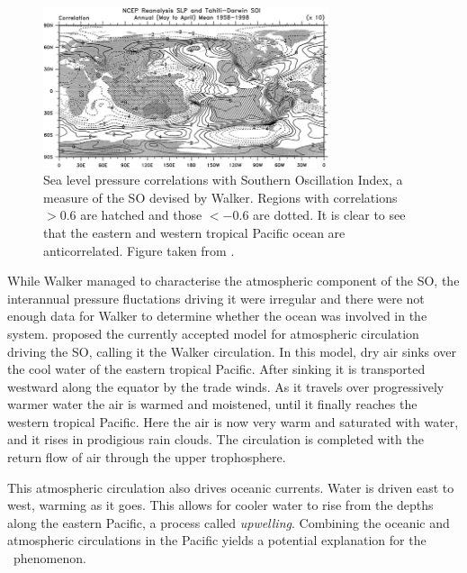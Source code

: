 \begin{figure}
  \centering
  \includegraphics[width=0.75\textwidth]{figures/slp_corr}
  \caption{Sea level pressure correlations with Southern Oscillation Index, a
    measure of the SO devised by Walker. Regions with correlations $>0.6$ are
    hatched and those $<-0.6$ are dotted. It is clear to see that the eastern
    and western tropical Pacific ocean are anticorrelated. Figure taken from
    \cite{trenberth2000}.}
  \label{fig:slp_corr}
\end{figure}

 While Walker managed to characterise the atmospheric component of the SO, the
 interannual pressure fluctations driving it were irregular and there were not
 enough data for Walker to determine whether the ocean was involved in the
 system. \cite{bjerknes1969} proposed the currently accepted model for
 atmospheric circulation driving the SO, calling it the Walker circulation. In
 this model, dry air sinks over the cool water of the eastern tropical
 Pacific. After sinking it is transported westward along the equator by the
 trade winds. As it travels over progressively warmer water the air is warmed
 and moistened, until it finally reaches the western tropical Pacific. Here the
 air is now very warm and saturated with water, and it rises in prodigious rain
 clouds. The circulation is completed with the return flow of air through the
 upper trophosphere.

This atmospheric circulation also drives oceanic currents. Water is driven east
to west, warming as it goes. This allows for cooler water to rise from the
depths along the eastern Pacific, a process called \emph{upwelling}. Combining
the oceanic and atmospheric circulations in the Pacific yields a potential
explanation for the \elnino\ phenomenon.

